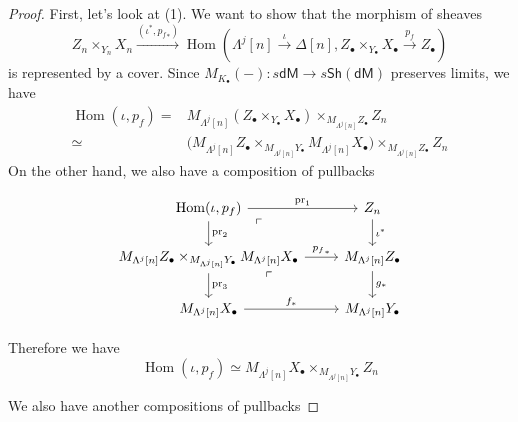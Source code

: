 \documentclass[12pt]{amsart}
\theoremstyle{definition}
\theoremstyle{remark}
\numberwithin{equation}{section}
\newcommand{\1}{{\mathbb{1}}}
\newcommand{\dm}{\mathsf{dM}}
\newcommand{\sh}{\mathsf{Sh}}
\newcommand{\bt}{\bullet}
\newcommand{\Hom}{\operatorname{Hom}}
\newcommand{\pr}{{\operatorname{pr}}}
\begin{document}
    \begin{proof}
        First, let's look at (1). We want to show that the morphism of sheaves
        \begin{equation*}
            Z_n \times_{Y_n} X_n \stackrel{(\iota^* , {p_{f}}_*)}{\longrightarrow} \Hom(\Lambda^j[n]\stackrel{\iota}{\to} \Delta[n], Z_{\bt} \times_{Y_{\bt}} X_{\bt}\stackrel{p_f}{\rightarrow} Z_{\bt})
        \end{equation*}
        is represented by a cover. Since $M_{K_{\bt}}(-): s\dm \to s\sh(\dm)$ preserves limits, we have
        \begin{align*}
            \Hom(\iota, p_f) =& M_{\Lambda^j[n]}(Z_{\bt} \times_{Y_{\bt}} X_{\bt}) \times_{M_{\Lambda^j[n]}Z_{\bt}} Z_n\\
            \simeq& \big(M_{\Lambda^j[n]}Z_{\bt} \times_{M_{\Lambda^j[n]}Y_{\bt}} M_{\Lambda^j[n]}X_{\bt}\big) \times_{M_{\Lambda^j[n]}Z_{\bt}} Z_n
        \end{align*}
        On the other hand, we also have a composition of pullbacks
        \begin{center}
        \begin{equation}\label{dia1}
            \begin{tikzcd}
{ \Hom(\iota, p_f)} \arrow[r, "\pr_1"] \arrow[d, "\pr_2"] \arrow[dr, phantom, "\ulcorner", very near start]& Z_n \arrow[d, "\iota^*"]  \\
{M_{\Lambda^j[n]}Z_{\bt} \times_{M_{\Lambda^j[n]}Y_{\bt}} M_{\Lambda^j[n]}X_{\bt}} \arrow[r, "{p_f}_*"] \arrow[d, "\pr_3"]      \arrow[dr, phantom, "\ulcorner", very near start]& {M_{\Lambda^j[n]}Z_{\bt}} \arrow[d, "g_*"] \\
{M_{\Lambda^j[n]}X_{\bt}} \arrow[r, "f_*"]                & {M_{\Lambda^j[n]}Y_{\bt}}          
\end{tikzcd}
\end{equation}
        \end{center}
        Therefore we have 
        \begin{equation}\label{iso1}
            \Hom(\iota, p_f) \simeq {M_{\Lambda^j[n]}X_{\bt}}\times_{M_{\Lambda^j[n]}Y_{\bt}} Z_n
        \end{equation}
    
        We also have another compositions of pullbacks
        

\end{proof}
\end{document}
